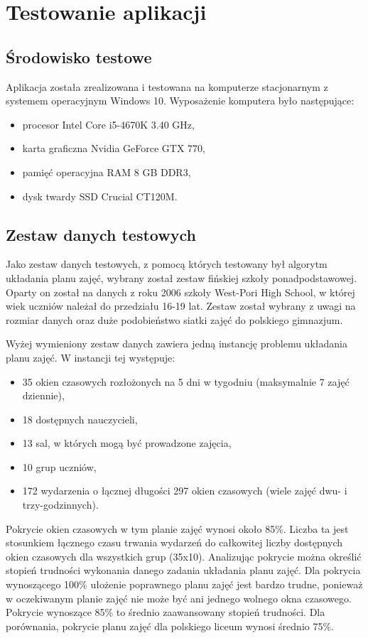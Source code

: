 \chapter{Testowanie aplikacji}

\section{Środowisko testowe}

Aplikacja została zrealizowana i testowana na komputerze stacjonarnym z systemem operacyjnym Windows 10. Wyposażenie komputera było następujące:

\begin{itemize}
\item procesor Intel Core i5-4670K 3.40 GHz,
\item karta graficzna Nvidia GeForce GTX 770,
\item pamięć operacyjna RAM 8 GB DDR3,
\item dysk twardy SSD Crucial CT120M.
\end{itemize}

\section{Zestaw danych testowych}

Jako zestaw danych testowych, z pomocą których testowany był algorytm układania planu zajęć, wybrany został zestaw fińskiej szkoły ponadpodstawowej. Oparty on został na danych z roku 2006 szkoły West-Pori High School, w której wiek uczniów należał do przedziału 16-19 lat. Zestaw został wybrany z uwagi na rozmiar danych oraz duże podobieństwo siatki zajęć do polskiego gimnazjum.

Wyżej wymieniony zestaw danych zawiera jedną instancję problemu układania planu zajęć. W instancji tej występuje:

\begin{itemize}
\item 35 okien czasowych rozłożonych na 5 dni w tygodniu (maksymalnie 7 zajęć dziennie),
\item 18 dostępnych nauczycieli,
\item 13 sal, w których mogą być prowadzone zajęcia,
\item 10 grup uczniów,
\item 172 wydarzenia o łącznej długości 297 okien czasowych (wiele zajęć dwu- i trzy-godzinnych).
\end{itemize}

Pokrycie okien czasowych w tym planie zajęć wynosi około 85\%. Liczba ta jest stosunkiem łącznego czasu trwania wydarzeń do całkowitej liczby dostępnych okien czasowych dla wszystkich grup (35x10). Analizując pokrycie można określić stopień trudności wykonania danego zadania układania planu zajęć. Dla pokrycia wynoszącego 100\% ułożenie poprawnego planu zajęć jest bardzo trudne, ponieważ w oczekiwanym planie zajęć nie może być ani jednego wolnego okna czasowego. Pokrycie wynoszące 85\% to średnio zaawansowany stopień trudności. Dla porównania, pokrycie planu zajęć dla polskiego liceum wynosi średnio 75\%.

